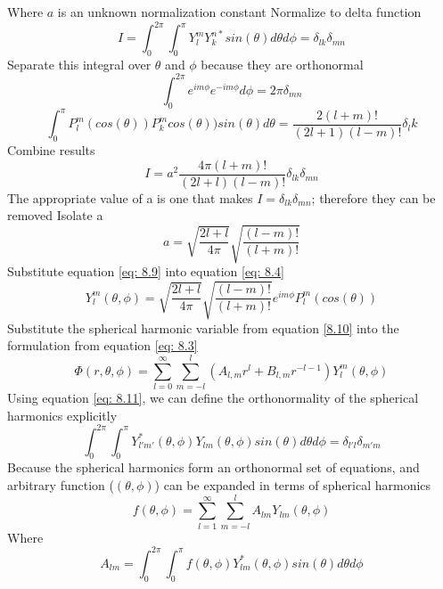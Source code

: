 \documentclass[12pt]{article}
\begin{document}
    Where $a$ is an unknown normalization constant
    \newline Normalize to delta function
    \begin{equation} \label{eq: 8.5}
        I = \int_0^{2\pi} \int_0^{\pi} Y_{l}^{m} Y_{k}^{n*} sin(\theta) d\theta d\phi = \delta_{lk} \delta_{mn}
    \end{equation}
    Separate this integral over $\theta$ and $\phi$ because they are orthonormal
    \begin{equation} \label{eq: 8.6}
        \int_0^{2\pi} e^{i m \phi} e^{-i m \phi} d\phi = 2 \pi \delta_{mn}
    \end{equation}
    \begin{equation} \label{eq: 8.7}
        \int_0^{\pi} P_l^m (cos(\theta)) P_k^m cos(\theta)) sin(\theta) d\theta = \frac{2 (l+m)!}{(2l+1)(l-m)!}\delta_lk
    \end{equation}
    Combine results
    \begin{equation} \label{eq: 8.8}
        I = a^2 \frac{4 \pi (l+m)!}{(2l+l)(l-m)!} \delta_{lk} \delta_{mn}
    \end{equation}
    The appropriate value of a is one that makes $I=\delta_{lk} \delta_{mn}$; therefore they can be removed
    \newline Isolate a
    \begin{equation} \label{eq: 8.9}
        a = \sqrt{\frac{2l+l}{4\pi}} \sqrt{\frac{(l-m)!}{(l+m)!}}
    \end{equation}
    Substitute equation \ref{eq: 8.9} into equation \ref{eq: 8.4}
    \begin{equation} \label{eq: 8.10}
        Y_{l}^{m}(\theta, \phi) = \sqrt{\frac{2l+l}{4\pi}} \sqrt{\frac{(l-m)!}{(l+m)!}} e^{i m \phi} P_l^m (cos(\theta))
    \end{equation}
    Substitute the spherical harmonic variable from equation \ref{8.10} into the formulation from equation \ref{eq: 8.3}
    \begin{equation} \label{eq: 8.11}
        \Phi(r,\theta, \phi) = \sum_{l=0}^{\infty} \sum_{m=-l}^l (A_{l,m} r^l + B_{l,m} r^{-l-1}) Y_{l}^{m}(\theta, \phi)
    \end{equation}     
    Using equation \ref{eq: 8.11}, we can define the orthonormality of the spherical harmonics explicitly
    \begin{equation} \label{eq: 8.12}
        \int_0^{2\pi} \int_0^{\pi} Y_{l'm'}^{*}(\theta,\phi) Y_{lm}(\theta, \phi) sin(\theta) d\theta d\phi = \delta_{l'l} \delta_{m'm}
    \end{equation}
    Because the spherical harmonics form an orthonormal set of equations, and arbitrary function ($(\theta,\phi)$) can be expanded in terms of spherical harmonics
    \begin{equation} \label{eq: 8.13}
        f(\theta,\phi) = \sum_{l=1}^{\infty} \sum_{m=-l}^{l} A_{lm} Y_{lm} (\theta,\phi)
    \end{equation}
    Where 
    \begin{equation} \label{eq: 8.14}
        A_{lm} = \int_0^{2\pi} \int_0^{\pi} f(\theta,\phi) Y_{lm}^{*} (\theta, \phi) sin(\theta) d\theta d\phi
    \end{equation}
\end{document}
